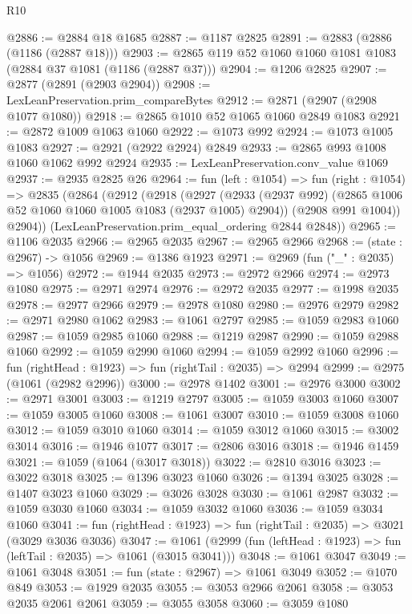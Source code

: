 \begin{lexlean}{R10}
\begin{coremodule}
@2886 := @2884 @18 @1685
@2887 := @1187 @2825
@2891 := @2883 (@2886 (@1186 (@2887 @18)))
@2903 := @2865 @119 @52 @1060 @1060 @1081 @1083 (@2884 @37 @1081 (@1186 (@2887 @37)))
@2904 := @1206 @2825
@2907 := @2877 (@2891 (@2903 @2904))
@2908 := LexLeanPreservation.prim_compareBytes
@2912 := @2871 (@2907 (@2908 @1077 @1080))
@2918 := @2865 @1010 @52 @1065 @1060 @2849 @1083
@2921 := @2872 @1009 @1063 @1060
@2922 := @1073 @992
@2924 := @1073 @1005 @1083
@2927 := @2921 (@2922 @2924) @2849
@2933 := @2865 @993 @1008 @1060 @1062 @992 @2924
@2935 := LexLeanPreservation.conv_value @1069
@2937 := @2935 @2825 @26
@2964 := fun (left : @1054) =>
  fun (right : @1054) =>
  @2835
    (@2864
      (@2912
        (@2918
          (@2927
            (@2933 (@2937 @992) (@2865 @1006 @52 @1060 @1060 @1005 @1083 (@2937 @1005) @2904))
            (@2908 @991 @1004))
          @2904))
      (LexLeanPreservation.prim_equal_ordering @2844 @2848))
@2965 := @1106 @2035
@2966 := @2965 @2035
@2967 := @2965 @2966
@2968 := (state : @2967) -> @1056
@2969 := @1386 @1923
@2971 := @2969 (fun ("_" : @2035) => @1056)
@2972 := @1944 @2035
@2973 := @2972 @2966
@2974 := @2973 @1080
@2975 := @2971 @2974
@2976 := @2972 @2035
@2977 := @1998 @2035
@2978 := @2977 @2966
@2979 := @2978 @1080
@2980 := @2976 @2979
@2982 := @2971 @2980 @1062
@2983 := @1061 @2797
@2985 := @1059 @2983 @1060
@2987 := @1059 @2985 @1060
@2988 := @1219 @2987
@2990 := @1059 @2988 @1060
@2992 := @1059 @2990 @1060
@2994 := @1059 @2992 @1060
@2996 := fun (rightHead : @1923) => fun (rightTail : @2035) => @2994
@2999 := @2975 (@1061 (@2982 @2996))
@3000 := @2978 @1402
@3001 := @2976 @3000
@3002 := @2971 @3001
@3003 := @1219 @2797
@3005 := @1059 @3003 @1060
@3007 := @1059 @3005 @1060
@3008 := @1061 @3007
@3010 := @1059 @3008 @1060
@3012 := @1059 @3010 @1060
@3014 := @1059 @3012 @1060
@3015 := @3002 @3014
@3016 := @1946 @1077
@3017 := @2806 @3016
@3018 := @1946 @1459
@3021 := @1059 (@1064 (@3017 @3018))
@3022 := @2810 @3016
@3023 := @3022 @3018
@3025 := @1396 @3023 @1060
@3026 := @1394 @3025
@3028 := @1407 @3023 @1060
@3029 := @3026 @3028
@3030 := @1061 @2987
@3032 := @1059 @3030 @1060
@3034 := @1059 @3032 @1060
@3036 := @1059 @3034 @1060
@3041 := fun (rightHead : @1923) => fun (rightTail : @2035) => @3021 (@3029 @3036 @3036)
@3047 := @1061 (@2999 (fun (leftHead : @1923) => fun (leftTail : @2035) => @1061 (@3015 @3041)))
@3048 := @1061 @3047
@3049 := @1061 @3048
@3051 := fun (state : @2967) => @1061 @3049
@3052 := @1070 @849
@3053 := @1929 @2035
@3055 := @3053 @2966 @2061
@3058 := @3053 @2035 @2061 @2061
@3059 := @3055 @3058
@3060 := @3059 @1080

\end{coremodule}
\end{lexlean}
